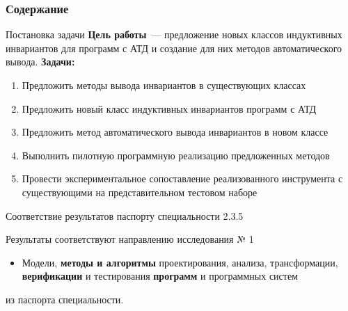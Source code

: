 \documentclass[22pt,aspectratio=169]{beamer}
\begin{document}
\togglefalse{fastCompile}



\begin{frame}[plain]
\titlepage
\end{frame}

\begin{frame}
\frametitle{Содержание}
\tableofcontents[
subsectionstyle=show/show/hide
]
\end{frame}


\whenFullCompile{}


\begin{framesection}{Постановка задачи}
\textbf{Цель работы}~--- предложение новых классов индуктивных инвариантов для программ с АТД и создание для них методов автоматического вывода. \textbf{Задачи:}

\begin{enumerate}
\item Предложить методы вывода инвариантов в существующих классах
\item Предложить новый класс индуктивных инвариантов программ с АТД
\item Предложить метод автоматического вывода инвариантов в новом классе
\item Выполнить пилотную программную реализацию предложенных методов
\item Провести экспериментальное сопоставление реализованного инструмента с существующими на представительном тестовом наборе
\end{enumerate}
\end{framesection}





\begin{frame}{Соответствие результатов паспорту специальности 2.3.5}

Результаты соответствуют направлению исследования  № 1
\begin{itemize}
\item Модели, \textbf{методы и алгоритмы} проектирования, анализа, трансформации, \textbf{верификации} и тестирования \textbf{программ} и программных систем
\end{itemize}
из паспорта специальности.
\end{frame}
\end{document}

